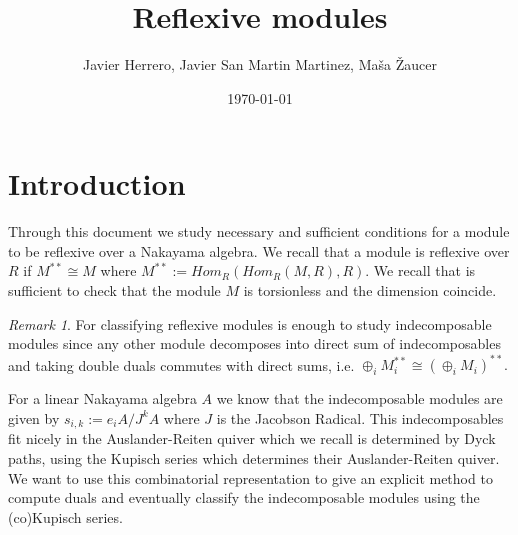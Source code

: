 \documentclass[12pt, a4paper]{article}
\title{Reflexive modules}
\author{Javier Herrero, Javier San Martin Martinez, Maša Žaucer}
\date{\today}
\numberwithin{equation}{section}
\theoremstyle{definition}
\theoremstyle{plain}
\theoremstyle{remark}
\newtheorem{remark}[definition]{Remark}
\begin{document}
\maketitle


\begin{abstract}
\end{abstract}

\section{Introduction}
Through this document we study necessary and sufficient conditions for a module to be reflexive over a Nakayama algebra. We recall that a module is reflexive over $R$ if $M^{**}\cong M$ where $M^{**}:=Hom_R(Hom_R(M,R),R).$ We recall that is sufficient to check that the module $M$ is torsionless and the dimension coincide.
\begin{remark}
    For classifying reflexive modules is enough to study indecomposable modules since any other module decomposes into direct sum of indecomposables and taking double duals commutes with direct sums, i.e. $\oplus_i M_i^{**}\cong (\oplus_iM_i)^{**}.$
\end{remark}
For a linear Nakayama algebra $A$ we know that the indecomposable modules are given by $s_{i,k}:=e_iA/J^kA$ where $J$ is the Jacobson Radical. This indecomposables fit nicely in the Auslander-Reiten quiver which we recall is determined by Dyck paths, using the Kupisch series which determines their Auslander-Reiten quiver. We want to use this combinatorial representation to give an explicit method to compute duals and eventually classify the indecomposable modules using the (co)Kupisch series. 
\end{document}
